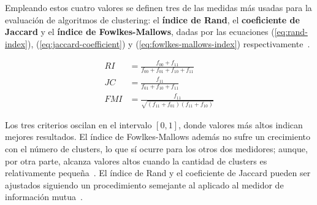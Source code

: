 Empleando estos cuatro valores se definen tres de las medidas más usadas para la evaluación de algoritmos de clustering: el \textbf{índice de Rand}, el \textbf{coeficiente de Jaccard} y el \textbf{índice de Fowlkes-Mallows}, dadas por las ecuaciones (\ref{eq:rand-index}), (\ref{eq:jaccard-coefficient}) y (\ref{eq:fowlkes-mallows-index}) respectivamente~\cite{Wagner07,Tan05,Aggarawal13}.

\begin{align}
    \label{eq:rand-index}
    RI & = \frac{f_{00} + f_{11}}{f_{00}+f_{01}+f_{10}+f_{11}} \\
    \label{eq:jaccard-coefficient}
    JC & = \frac{f_{11}}{f_{01}+f_{10}+f_{11}} \\
    \label{eq:fowlkes-mallows-index}
    FMI & = \frac{f_{11}}{\sqrt{(f_{11}+f_{01})(f_{11}+f_{10})}}
\end{align}

Los tres criterios oscilan en el intervalo $[0,1]$, donde valores más altos indican mejores resultados.
El índice de Fowlkes-Mallows además no sufre un crecimiento con el número de clusters, lo que sí ocurre para los otros dos medidores;
aunque, por otra parte, alcanza valores altos cuando la cantidad de clusters es relativamente pequeña~\cite{Wagner07}.
El índice de Rand y el coeficiente de Jaccard pueden ser ajustados siguiendo un procedimiento semejante al aplicado al medidor de información mutua~\cite{Vinh10, Wagner07}.

